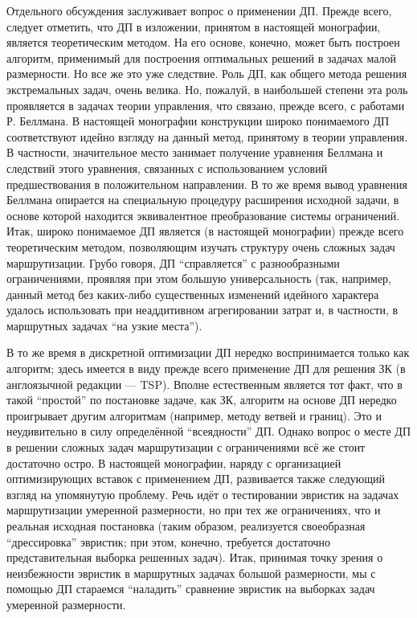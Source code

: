 \documentclass[12pt,twoside]{report}
\begin{document}
Отдельного обсуждения заслуживает вопрос о применении ДП.
Прежде всего, следует отметить, что ДП в изложении,
принятом в настоящей монографии,
является теоретическим методом.
На его основе, конечно, может быть построен алгоритм,
применимый для построения оптимальных решений
в задачах малой размерности. Но все же это уже следствие.
Роль ДП, как общего метода решения экстремальных задач,
очень велика.
Но, пожалуй, в наибольшей степени эта роль проявляется
в задачах теории управления, что связано, прежде всего,
с работами Р. Беллмана.
В настоящей монографии конструкции широко понимаемого ДП
соответствуют идейно взгляду на данный метод,
принятому в теории управления.
В частности, значительное место занимает
получение уравнения Беллмана и следствий этого уравнения,
связанных с использованием условий предшествования
в положительном направлении.
В то же время вывод уравнения Беллмана
опирается на специальную процедуру расширения исходной задачи,
в основе которой находится эквивалентное преобразование системы ограничений.
Итак, широко понимаемое ДП является (в настоящей монографии)
прежде всего теоретическим методом,
позволяющим изучать структуру очень сложных задач маршрутизации.
Грубо говоря, ДП ``справляется'' с разнообразными ограничениями,
проявляя при этом большую универсальность
(так, например, данный метод без каких-либо
существенных изменений идейного характера
удалось использовать при неаддитивном агрегировании затрат и,
в частности, в маршрутных задачах  “на узкие места”).

В то же время в дискретной оптимизации ДП
нередко воспринимается только как алгоритм;
здесь имеется в виду прежде всего применение
ДП для решения ЗК
(в англоязычной редакции — TSP).
Вполне естественным является тот факт,
что в такой “простой” по постановке задаче,
как ЗК, алгоритм на основе ДП нередко проигрывает
другим алгоритмам
(например, методу ветвей и границ).
Это и неудивительно в силу определённой “всеядности” ДП.
Однако вопрос о месте ДП в решении
сложных задач маршрутизации с ограничениями
всё же стоит достаточно остро.
В настоящей монографии, наряду с организацией оптимизирующих вставок
с применением ДП,
развивается также следующий взгляд
на упомянутую проблему.
Речь идёт о тестировании эвристик на
задачах маршрутизации умеренной размерности,
но при тех же ограничениях,
что и реальная исходная постановка
(таким образом, реализуется своеобразная
“дрессировка” эвристик; при этом,
конечно, требуется достаточно представительная выборка решенных задач).
Итак, принимая точку зрения о неизбежности эвристик
в маршрутных задачах большой размерности,
мы с помощью ДП стараемся “наладить”
сравнение эвристик на выборках задач умеренной размерности.
\end{document}
